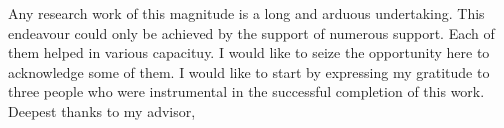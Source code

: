 
\large {
Any research work of this magnitude is a long and arduous undertaking. This endeavour
could only be achieved by the support of numerous support. Each of them helped in
various capacituy. I would like to seize the opportunity here to acknowledge some of
them.
I would like to start by expressing my gratitude to three people who were instrumental
in the successful completion of this work. Deepest thanks to my advisor,
























}